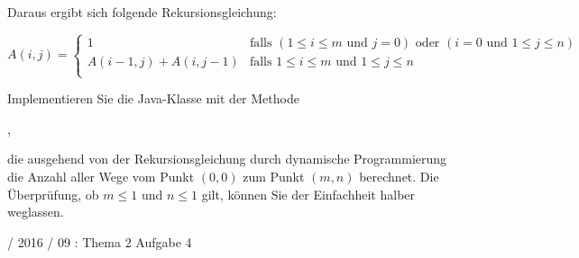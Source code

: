 \documentclass{lehramt-informatik-haupt}
\begin{document}
\noindent
Daraus ergibt sich folgende Rekursionsgleichung:

\begin{equation*}
A(i, j) =
\begin{cases}
1 &
\text{falls }
(1 \leq i \leq m \text{ und } j = 0) \text{ oder }
(i = 0 \text{ und } 1 \leq j \leq n) \\

A(i - 1, j) + A(i, j - 1) &
\text{falls }
1 \leq i \leq m \text{ und }
1 \leq j \leq n \\
\end{cases}
\end{equation*}

\noindent
Implementieren Sie die Java-Klasse  mit der Methode

\begin{center}
,
\end{center}

\noindent
die ausgehend von der Rekursionsgleichung durch dynamische
Programmierung die Anzahl aller Wege vom Punkt $(0, 0)$ zum Punkt $(m,
n)$ berechnet.
Die Überprüfung, ob $m \leq 1$ und $n \leq 1$ gilt, können Sie der
Einfachheit halber weglassen.

\begin{antwort}
\end{antwort}

%

 / 2016 / 09 : Thema 2 Aufgabe 4

\literatur
\end{document}
